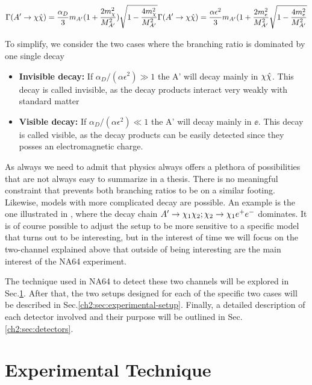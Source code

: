 \begin{equation}
\label{ch1:eq:dm-bratio}
\Gamma(A'\rightarrow\chi \hat{\chi}) = \frac{\alpha_D}{3}m_{A'}(1 + \frac{2m^2_{\chi}}{M^2_{A'}})\sqrt{1 - \frac{4m^2_{\chi}}{M^2_{A'}}} 
\Gamma(A'\rightarrow\chi \hat{\chi}) = \frac{\alpha \epsilon^2}{3}m_{A'}(1 + \frac{2m^2_{e}}{M^2_{A'}}\sqrt{1 - \frac{4m^2_{e}}{M^2_{A'}}} 
\end{equation}

To simplify, we consider the two cases where the branching ratio is dominated by one single decay

\begin{itemize}
\item \textbf{Invisible decay:} If $\alpha_D / (\alpha \epsilon^2) \gg 1$ the A' will decay mainly in $\chi \hat{\chi}$. This decay is called invisible, as the decay products interact very weakly with standard matter
\item \textbf{Visible decay:} If $\alpha_D / (\alpha \epsilon^2) \ll 1$ the A' will decay mainly in $\ee$. This decay is called visible, as the decay products can be easily detected since they posses an electromagnetic charge. 
\end{itemize}

As always we need to admit that physics always offers a plethora of possibilities that are not always easy to summarize in a thesis. There is no meaningful constraint that prevents both branching ratios to be on a similar footing. Likewise, models with more complicated decay are possible. An example is the one illustrated in \cite{Mohlabeng_2019}, where the decay chain $A' \to \chi_1 \chi_2; \chi_2 \to \chi_1 e^+e^-$ dominates. It is of course possible to adjust the setup to be more sensitive to a specific model that turns out to be interesting, but in the interest of time we will focus on the two-channel explained above that outside of being interesting are the main interest of the NA64 experiment.

The technique used in NA64 to detect these two channels will be explored in Sec.\ref{ch2:sec:experimental-technique}. After that, the two setups designed for each of the specific two cases will be described in Sec.\ref{ch2:sec:experimental-setup}. Finally, a detailed description of each detector involved and their purpose will be outlined in Sec.\ref{ch2:sec:detectors}.


\section{Experimental Technique}
\label{ch2:sec:experimental-technique}

